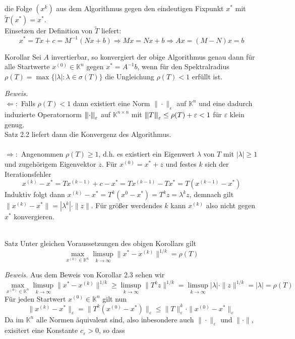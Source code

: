die Folge $(x^k)$ aus dem Algorithmus gegen den eindeutigen Fixpunkt $x^*$ mit $\tilde{T}(x^*)=x^*$. \\ 
Einsetzen der Definition von $\tilde{T}$ liefert:
\[x^*=Tx+c=M^{-1}(Nx+b)\Rightarrow Mx=Nx+b \Rightarrow Ax=(M-N)x=b\]
\begin{thmbox}{Korollar}
    Sei $A$ invertierbar, so konvergiert der obige Algorithmus genau dann für alle Startwerte $x^{(0)}\in\mathbb{K}^n$ 
    gegen $x^*=A^{-1}b$, wenn für den Spektralradius $\rho(T)=\max\{|\lambda|:\lambda\in\sigma(T)\}$ 
    die Ungleichung $\rho(T)<1$ erfüllt ist.
\end{thmbox}
\textit{Beweis.} \\
$\Leftarrow:$ Falls $\rho(T)<1$ dann existiert eine Norm $\|\cdot\|_\varepsilon$ auf $\mathbb{K}^n$ 
und eine dadurch induzierte Operatornorm ${\left\vert\kern-0.25ex\left\vert\kern-0.25ex\left\vert \cdot \right\vert\kern-0.25ex\right\vert\kern-0.25ex\right\vert}_\varepsilon$ auf $\mathbb{K}^{n\times n}$ 
mit ${\left\vert\kern-0.25ex\left\vert\kern-0.25ex\left\vert T \right\vert\kern-0.25ex\right\vert\kern-0.25ex\right\vert}_\varepsilon \leq \rho(T) + \varepsilon < 1$ für $\varepsilon$ klein genug. \\
Satz 2.2 liefert dann die Konvergenz des Algorithmus. \\ \\
$\Rightarrow:$ Angenommen $\rho(T)\geq 1$, d.h. es existiert ein Eigenwert $\lambda$ von $T$ 
mit $|\lambda|\geq 1$ und zugehörigem Eigenvektor $z$. Für $x^{(0)}=x^*+z$ und festes $k$ sich der Iterationsfehler
\[x^{(k)}-x^* = Tx^{(k-1)}+c-x^* = Tx^{(k-1)}-Tx^* = T(x^{(k-1)}-x^*)\]
Induktiv folgt dann $x^{(k)}-x^* = T^k(x^{0}-x^*)=T^kz=\lambda^kz$, demnach gilt 
$\|x^{(k)}-x^*\|=|\lambda^k|\cdot\|z\|$.
Für größer werdendes $k$ kann $x^{(k)}$ also nicht gegen $x^*$ konvergieren. \\ \\
\begin{thmbox}{Satz}
    Unter gleichen Voraussetzungen des obigen Korollars gilt 
    \[\max_{x^{(0)}\in\mathbb{K}^n} \limsup_{k\rightarrow \infty} \|x^*-x^{(k)}\|^{1/k}=\rho(T)\]
\end{thmbox}
\textit{Beweis.}
Aus dem Beweis von Korollar 2.3 sehen wir
\[\max_{x^{(0)}\in\mathbb{K}^n} \limsup_{k\rightarrow \infty} \|x^*-x^{(k)}\|^{1/k}
\geq\limsup_{k\rightarrow\infty} \|T^kz\|^{1/k}=\limsup_{k\rightarrow\infty}|\lambda|\cdot\|z\|^{1/k}
=|\lambda|=\rho(T)\]
Für jeden Startwert $x^{(0)}\in\mathbb{K}^n$ gilt nun 
\[\|x^{(k)}-x^*\|_\varepsilon = \|T^k(x^{(0)}-x^*)\|_\varepsilon
\leq \|T\|_\varepsilon^k\cdot \|x^{(0)}-x^*\|_\varepsilon\]
Da im $\mathbb{K}^n$ alle Normen äquivalent sind, also inbesondere auch $\|\cdot\|_\varepsilon$ 
und $\|\cdot\|$, exisitert eine Konstante $c_\varepsilon>0$, so dass
